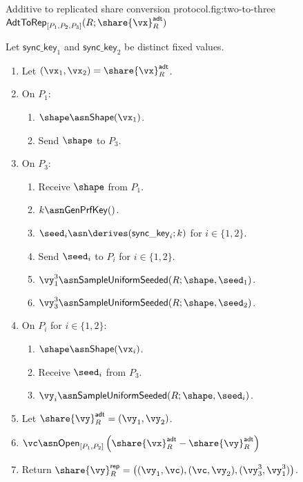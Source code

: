 
\begin{Boxfig}{Additive to replicated share conversion protocol.}{fig:two-to-three}{$\mathsf{AdtToRep}_{[P_1, P_2, P_3]}(R; \share{\vx}^{\mathsf{adt}}_{R})$}

Let $\mathsf{sync\_key}_1$ and $\mathsf{sync\_key}_2$ be distinct fixed values.

\begin{enumerate}
\item Let $(\vx_1, \vx_2) = \share{\vx}^{\mathsf{adt}}_{R}$.

\item On $P_1$:
\begin{enumerate}
  \item $\shape \asn \mathsf{Shape}(\vx_1)$.
  \item Send $\shape$ to $P_3$.
\end{enumerate}

\item On $P_3$:
\begin{enumerate}
  \item Receive $\shape$ from $P_1$.
  \item $k \asn \mathsf{GenPrfKey}()$.
  \item $\seed_i \asn \derives(\mathsf{sync\_key}_i; k)$ for $i \in \{1, 2\}$.
  \item Send $\seed_i$ to $P_i$ for $i \in \{1, 2\}$.
  \item $\vy_1^3 \asn \mathsf{SampleUniformSeeded}(R; \shape, \seed_1)$.
  \item $\vy_3^3 \asn \mathsf{SampleUniformSeeded}(R; \shape, \seed_2)$.
\end{enumerate}

\item On $P_i$ for $i \in \{1,2\}$:
\begin{enumerate}
  \item $\shape \asn \mathsf{Shape}(\vx_i)$.
  \item Receive $\seed_i$ from $P_3$.
  \item $\vy_i \asn \mathsf{SampleUniformSeeded}(R; \shape, \seed_i)$.
\end{enumerate}

\item Let $\share{\vy}^{\mathsf{adt}}_{R} = (\vy_1, \vy_2)$.

\item $\vc \asn \mathsf{Open}_{[P_1, P_2]}\left( \share{\vx}^{\mathsf{adt}}_{R} - \share{\vy}^{\mathsf{adt}}_{R} \right)$

\item Return $\share{\vy}^{\mathsf{rep}}_{R} = \left( (\vy_1, \vc), (\vc, \vy_2), (\vy_3^3, \vy_1^3) \right)$.
\end{enumerate}
\end{Boxfig}

